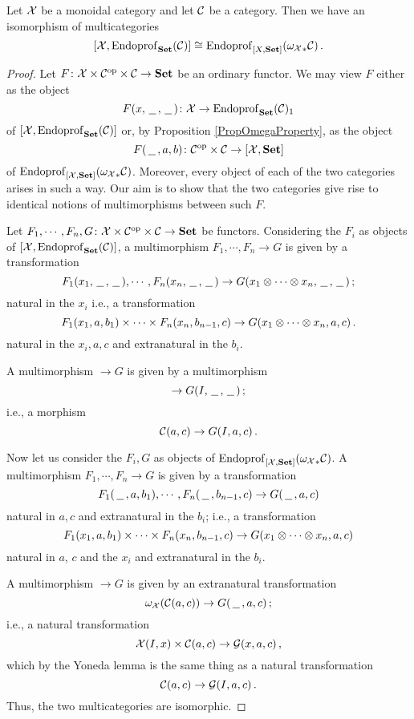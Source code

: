\documentclass{article}
\begin{document}
\begin{theorem}
  \label{StokessTheorem}
  Let $\mathcal X$ be a monoidal category and let ${\mathcal{C}}$ be a category.  
  Then we have an isomorphism of multicategories
  \[
    [\mathcal X,\operatorname{Endoprof}_{{\normalfont\textbf{Set}}}({\mathcal{C}})] \cong \operatorname{Endoprof}_{[X,{\normalfont\textbf{Set}}]}({\omega_\mathcal X}_*{\mathcal{C}})\,.
    \]
\end{theorem}
\begin{proof}
  Let $F \colon \mathcal X\times{\mathcal{C}}^{\mathrm{op}}\times{\mathcal{C}} \to {\normalfont\textbf{Set}}$ be an ordinary functor.  
  We may view $F$ either as the object
  \[
    F(x, \,\underline{\hspace{1.5ex}}\,, \,\underline{\hspace{1.5ex}}\,) \colon \mathcal X \to \operatorname{Endoprof}_{\normalfont\textbf{Set}}({\mathcal{C}})_1
    \]
  of $[\mathcal X,\operatorname{Endoprof}_{{\normalfont\textbf{Set}}}({\mathcal{C}})]$ or, by Proposition \ref{PropOmegaProperty}, as the object
  \[
    F(\,\underline{\hspace{1.5ex}}\,, a, b) \colon {\mathcal{C}}^{\mathrm{op}} \times {\mathcal{C}} \to [\mathcal X,{\normalfont\textbf{Set}}]
    \]
  of $\operatorname{Endoprof}_{[\mathcal X,{\normalfont\textbf{Set}}]}({\omega_\mathcal X}_*{\mathcal{C}})$.
  Moreover, every object of each of the two categories arises in such a way.  
  Our aim is to show that the two categories give rise to identical notions of multimorphisms between such $F$.

  Let $F_1,\cdots,F_n,G \colon \mathcal X \times {\mathcal{C}}^{\mathrm{op}}\times{\mathcal{C}}\to {\normalfont\textbf{Set}}$ be functors.  
  Considering the $F_i$ as objects of $[\mathcal X,\operatorname{Endoprof}_{\normalfont\textbf{Set}}({\mathcal{C}})]$, a multimorphism $F_1,\cdots,F_n\to G$ is given by a transformation
  \[
    F_1(x_1,\,\underline{\hspace{1.5ex}}\,,\,\underline{\hspace{1.5ex}}\,),\cdots, F_n(x_n,\,\underline{\hspace{1.5ex}}\,,\,\underline{\hspace{1.5ex}}\,) \to G(x_1\otimes\cdots\otimes x_n,\,\underline{\hspace{1.5ex}}\,,\,\underline{\hspace{1.5ex}}\,)\,;
    \]
  natural in the $x_i$ i.e., a transformation
  \[
    F_1(x_1,a,b_1)\times\cdots\times F_n(x_n,b_{n-1},c) \to G(x_1\otimes\cdots\otimes x_n,a,c)\,.
    \]
  natural in the $x_i,a,c$ and extranatural in the $b_i$.

  A multimorphism $\to G$ is given by a multimorphism
  \[
    \to G(I,\,\underline{\hspace{1.5ex}}\,,\,\underline{\hspace{1.5ex}}\,)\,;
    \]
  i.e., a morphism
  \[
    {\mathcal{C}}(a,c) \to G(I,a,c)\,.
    \]

  Now let us consider the $F_i,G$ as objects of $\operatorname{Endoprof}_{[\mathcal X,{\normalfont\textbf{Set}}]}({\omega_\mathcal X}_*{\mathcal{C}})$.  
  A multimorphism $F_1,\cdots,F_n\to G$ is given by a transformation
  \[
    F_1(\,\underline{\hspace{1.5ex}}\,,a,b_1),\cdots,F_n(\,\underline{\hspace{1.5ex}}\,,b_{n-1},c) \to G(\,\underline{\hspace{1.5ex}}\,,a,c)
    \]
  natural in $a,c$ and extranatural in the $b_i$; i.e., a transformation
  \[
    F_1(x_1,a,b_1)\times\cdots\times F_n(x_n,b_{n-1},c) \to G(x_1\otimes\cdots\otimes x_n,a,c)
    \]
  natural in $a$, $c$ and the $x_i$ and extranatural in the $b_i$.  

  A multimorphism $\to G$ is given by an extranatural transformation
  \[
    \omega_\mathcal X({\mathcal{C}}(a,c)) \to G(\,\underline{\hspace{1.5ex}}\,,a,c)\,;
    \]
  i.e., a natural transformation
  \[
    \mathcal X(I,x)\times{\mathcal{C}}(a,c) \to \mathcal G(x,a,c)\,,
    \]
  which by the Yoneda lemma is the same thing as a natural transformation
  \[
    {\mathcal{C}}(a,c) \to \mathcal G(I,a,c)\,.
    \]
  Thus, the two multicategories are isomorphic.
\end{proof}
\end{document}
